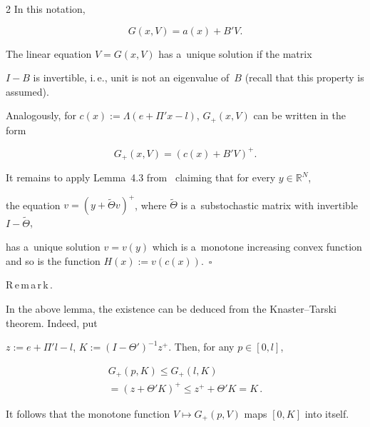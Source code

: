 \begin{multicols}{2}
In this notation,

$$ 

G(x, V) = a(x) + B' V. 

$$

The  linear equation $V=G(x,V)$ has a~unique solution if the matrix 

$I-B$ is invertible, i.\,e., unit is not an eigenvalue of~$B$ (recall that this property is  assumed). 



 

 Analogously, for $c(x) := \Lambda (e + \Pi'x - l)$, $G_+(x, V)$ can be written in the form 

$$ G_+(x, V) = (c(x) + B' V)^+.

 $$

It remains to apply   Lemma~4.3 from~\cite{kabanov2018clearing} claiming that for every $y\in \mathbb{R}^N$, 

the equation $v=(y+\tilde \Theta v)^+$, where $\tilde \Theta$ is a~substochastic matrix with invertible $I-\tilde \Theta$, 

has a~unique solution $v=v(y)$ which is a~monotone increasing  convex function and so is the function $H(x):=v(c(x))$.~\hfill$\square$ 



\smallskip



\noindent 

R\,e\,m\,a\,r\,k\,.\ \

In the above lemma, the existence can be deduced from the Knaster--Tarski theorem. Indeed, put 

$z := e + \Pi' l - l$, $K := (I - \Theta')^{-1} z^+$. Then, for any $p \in [0, l]$,

\begin{multline*}

G_+(p, K) \leq G_+(l, K) \\

{}= \left(z + \Theta' K\right)^+ \leq z^+ + \Theta' K =  K\,.  

\end{multline*}

It follows that  the monotone function  $V \mapsto G_+(p, V)$ maps $[0, K]$ into itself.







\smallskip



\noindent


\end{multicols}
